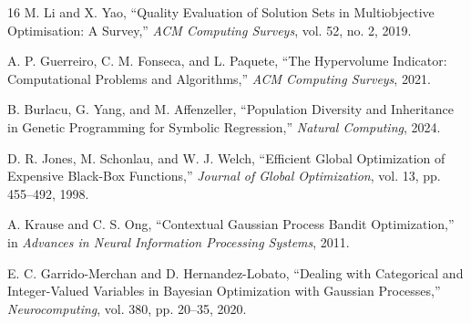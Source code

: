\documentclass[a4paper,10pt,twocolumn]{ltjsarticle}
\begin{document}
\begin{thebibliography}{16}
M. Li and X. Yao,
``Quality Evaluation of Solution Sets in Multiobjective Optimisation: A Survey,''
\emph{ACM Computing Surveys}, vol. 52, no. 2, 2019.

A. P. Guerreiro, C. M. Fonseca, and L. Paquete,
``The Hypervolume Indicator: Computational Problems and Algorithms,''
\emph{ACM Computing Surveys}, 2021.

B. Burlacu, G. Yang, and M. Affenzeller,
``Population Diversity and Inheritance in Genetic Programming for Symbolic Regression,''
\emph{Natural Computing}, 2024.

D. R. Jones, M. Schonlau, and W. J. Welch,
``Efficient Global Optimization of Expensive Black-Box Functions,''
\emph{Journal of Global Optimization}, vol. 13, pp. 455--492, 1998.

A. Krause and C. S. Ong,
``Contextual Gaussian Process Bandit Optimization,''
in \emph{Advances in Neural Information Processing Systems}, 2011.

E. C. Garrido-Merchan and D. Hernandez-Lobato,
``Dealing with Categorical and Integer-Valued Variables in Bayesian Optimization with Gaussian Processes,''
\emph{Neurocomputing}, vol. 380, pp. 20--35, 2020.

\end{thebibliography}
\end{document}
